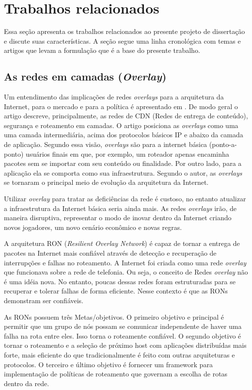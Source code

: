 \chapter{Trabalhos relacionados}

Essa seção apresenta os trabalhos relacionados ao presente projeto de 
dissertação e discute suas características.
A seção segue uma linha cronológica com temas e artigos que levam a 
formulação que é a base do presente trabalho.

\section{As redes em camadas (\emph{Overlay})}

Um entendimento das implicações de redes \emph{overlays} para a 
arquitetura da Internet, para o mercado e para a política
é apresentado em \citep{clark2006overlay}. 
De modo geral o artigo descreve, principalmente, as redes de 
CDN (Redes de entrega de conteúdo), segurança e roteamento em camadas. 
O artigo posiciona as \emph{overlays} como uma uma camada intermediária, 
acima dos protocolos básicos IP e abaixo da camada de 
aplicação. 
Segundo essa visão, \emph{overlays} são para a internet básica (ponto-a-ponto)
usuários finais em que, por exemplo, um roteador apenas encaminha pacotes sem
se importar com seu conteúdo ou finalidade. 
Por outro lado, para a aplicação ela se comporta como sua infraestrutura. 
Segundo o autor, as \emph{overlays} se tornaram o principal meio de 
evolução da arquitetura da Internet.

Utilizar \emph{overlay} para tratar as deficiências da rede é custoso, no
entanto atualizar a infraestrutura da Internet básica seria ainda mais. 
As redes \emph{overlays} irão, de maneira disruptiva, representar o modo de 
inovar dentro da Internet criando novos jogadores, 
um novo cenário econômico e novas regras.

A arquitetura RON (\emph{Resilient Overlay Network}) 
\citep{anderson2001resilient} é capaz de tornar a entrega de pacotes na 
Internet mais confiável através de detecção e recuperação de interrupções e 
falhas no roteamento. 
A Internet foi criada como uma rede \emph{overlay} que funcionava sobre a rede 
de telefonia. Ou seja, o conceito de Redes \emph{overlay} não é uma idéia nova.
No entanto, poucas dessas redes foram estruturadas para se recuperar e tolerar 
falhas de forma eficiente. Nesse contexto é que as RONs demonstram ser 
confiáveis.

As RONs possuem três Metas/objetivos. O primeiro objetivo e principal é 
permitir que um grupo de nós possam se comunicar independente de haver uma 
falha na rota entre eles. 
Isso torna o roteamente confiável. O segundo objetivo
é tornar o roteamento e a seleção de próximo host com aplicações distribuídas 
mais forte, mais eficiente do que tradicionalmente é feito com outras 
arquiteturas e protocolos. 
O terceiro e último objetivo é fornecer um framework 
para implementação de políticas de roteamento que governam a escolha de rotas 
dentro da rede. 

